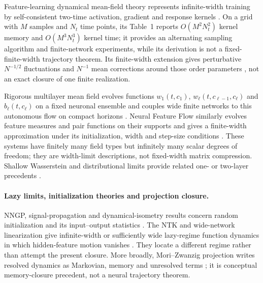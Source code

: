 \documentclass[11pt]{article}
\theoremstyle{definition}
\theoremstyle{remark}
\begin{document}
Feature-learning dynamical mean-field theory represents infinite-width training
by self-consistent two-time activation, gradient and response kernels
\citep{bordelon2022dmft}.  On a grid with $M$ samples and $N_t$ time points,
its Table~1 reports $O(M^2N_t^2)$ kernel memory and $O(M^3N_t^3)$ kernel time;
it provides an alternating sampling algorithm and finite-network experiments,
while its derivation is not a fixed-finite-width trajectory theorem.  Its
finite-width extension gives perturbative $N^{-1/2}$ fluctuations and
$N^{-1}$ mean corrections around those order parameters
\citep{bordelon2023finite}, not an exact closure of one finite realization.

Rigorous multilayer mean field evolves functions
$w_1(t,c_1)$, $w_\ell(t,c_{\ell-1},c_\ell)$ and $b_\ell(t,c_\ell)$ on a fixed
neuronal ensemble and couples wide finite networks to this autonomous flow on
compact horizons \citep{nguyen2023rigorous}.  Neural Feature Flow similarly
evolves feature measures and pair functions on their supports and gives a
finite-width approximation under its initialization, width and step-size
conditions \citep{fang2020features}.  These systems have finitely many field
types but infinitely many scalar degrees of freedom; they are width-limit
descriptions, not fixed-width matrix compression.  Shallow Wasserstein and
distributional limits provide related one- or two-layer precedents
\citep{chizat2018global,sirignano2019lln,mei2018meanfield}.

\paragraph{Lazy limits, initialization theories and projection closure.}
NNGP, signal-propagation and dynamical-isometry results concern random
initialization and its input--output statistics
\citep{lee2018nngp,schoenholz2017deep,pennington2017resurrecting}.
The NTK and wide-network linearization give infinite-width or sufficiently wide
lazy-regime function dynamics in which hidden-feature motion vanishes
\citep{jacot2018ntk,lee2019wide}.  They locate a different regime rather than
attempt the present closure.  More broadly, Mori--Zwanzig projection writes
resolved dynamics as Markovian, memory and unresolved terms
\citep{chorin2000optimal}; it is conceptual memory-closure precedent, not a
neural trajectory theorem.
\end{document}
